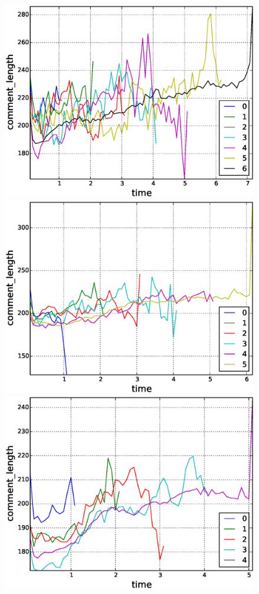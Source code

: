 \begin{figure}[!tb]
\centering
\includegraphics[scale=0.2]{./images/avr_comment_length_for_surviving_year_for_2008.eps}
\includegraphics[scale=0.2]{./images/avr_comment_length_for_surviving_year_for_2009.eps}
\includegraphics[scale=0.2]{./images/avr_comment_length_for_surviving_year_for_2010.eps}

\end{figure}
